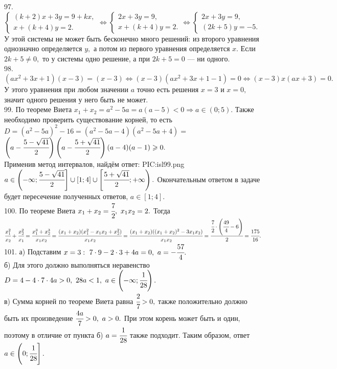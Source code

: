 97. $\begin{cases}
(k+2)x+3y=9+kx,\\
x+(k+4)y=2.
\end{cases}\Leftrightarrow\begin{cases}
2x+3y=9,\\
x+(k+4)y=2.
\end{cases}\Leftrightarrow\begin{cases}
2x+3y=9,\\
(2k+5)y=-5.
\end{cases}$
У этой системы не может быть бесконечно много решений: из второго уравнения однозначно определяется $y,$ а потом из первого уравнения определяется $x.$ Если $2k+5\neq0,$ то у системы одно решение, а при $2k+5=0$ --- ни одного.\\
98. $(ax^2+3x+1)(x-3)=(x-3)\Leftrightarrow (x-3)(ax^2+3x+1-1)=0\Leftrightarrow (x-3)x(ax+3)=0.$ У этого уравнения при любом значении $a$ точно есть решения $x=3$ и $x=0,$ значит одного решения у него быть не может.\\
99. По теореме Виета $x_1+x_2=a^2-5a=a(a-5)<0\Rightarrow a\in(0;5).$ Также необходимо проверить существование корней, то есть $D=(a^2-5a)^2-16=
(a^2-5a-4)(a^2-5a+4)=$\\$\left(a-\cfrac{5-\sqrt{41}}{2}\right)\left(a-\cfrac{5+\sqrt{41}}{2}\right)(a-4)(a-1)\geqslant0.$\\ Применив метод интервалов, найдём ответ:
{{PIC:isl99.png}}
$a\in\left(-\infty;\cfrac{5-\sqrt{41}}{2}\right]\cup[1;4]\cup\left[\cfrac{5+\sqrt{41}}{2};+\infty\right).$
Окончательным ответом в задаче будет пересечение полученных ответов, $a\in [1;4].$\\
100. По теореме Виета $x_1+x_2=\cfrac{7}{2},\ x_1x_2=2.$ Тогда $\cfrac{x_1^2}{x_2}+\cfrac{x_2^2}{x_1}=\cfrac{x_1^3+x_2^3}{x_1x_2}=\cfrac{(x_1+x_2)(x_1^2-x_1x_2+x_2^2)}{x_1x_2}=
\cfrac{(x_1+x_2)((x_1+x_2)^2-3x_1x_2)}{x_1x_2}=\cfrac{\cfrac{7}{2}\cdot\left(\cfrac{49}{4}-6\right)}{2}=\cfrac{175}{16}.$\\
101. а) Подставим $x=3:\ 7\cdot9-2\cdot3+4a=0,\ a=-\cfrac{57}{4}.$\\
б) Для этого должно выполняться неравенство $D=4-4\cdot7\cdot4a>0,\ 28a<1,\ a\in\left(-\infty;\cfrac{1}{28}\right).$\\
в) Сумма корней по теореме Виета равна $\cfrac{2}{7}>0,$ также положительно должно быть их произведение $\cfrac{4a}{7}>0,\ a>0.$ При этом корень может быть и один, поэтому в отличие от пункта б) $a=\cfrac{1}{28}$ также подходит. Таким образом, ответ $a\in\left(0;\cfrac{1}{28}\right].$\\
